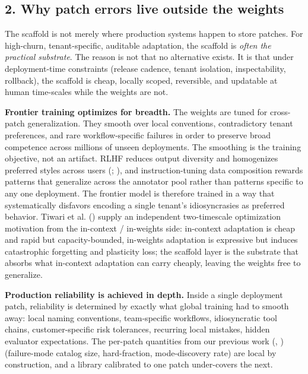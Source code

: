 \documentclass[
]{article}
\begin{document}
\subsection{2. Why patch errors live outside the
weights}\label{why-patch-errors-live-outside-the-weights}

The scaffold is not merely where production systems happen to store
patches. For high-churn, tenant-specific, auditable adaptation, the
scaffold is \emph{often the practical substrate}. The reason is not that
no alternative exists. It is that under deployment-time constraints
(release cadence, tenant isolation, inspectability, rollback), the
scaffold is cheap, locally scoped, reversible, and updatable at human
time-scales while the weights are not.

\textbf{Frontier training optimizes for breadth.} The weights are tuned
for cross-patch generalization. They smooth over local conventions,
contradictory tenant preferences, and rare workflow-specific failures in
order to preserve broad competence across millions of unseen
deployments. The smoothing is the training objective, not an artifact.
RLHF reduces output diversity and homogenizes preferred styles across
users (;
), and
instruction-tuning data composition rewards patterns that generalize
across the annotator pool rather than patterns specific to any one
deployment. The frontier model is therefore trained in a way that
systematically disfavors encoding a single tenant's idiosyncrasies as
preferred behavior. Tiwari et al.
() supply an independent
two-timescale optimization motivation from the in-context / in-weights
side: in-context adaptation is cheap and rapid but capacity-bounded,
in-weights adaptation is expressive but induces catastrophic forgetting
and plasticity loss; the scaffold layer is the substrate that absorbs
what in-context adaptation can carry cheaply, leaving the weights free
to generalize.

\textbf{Production reliability is achieved in depth.} Inside a single
deployment patch, reliability is determined by exactly what global
training had to smooth away: local naming conventions, team-specific
workflows, idiosyncratic tool chains, customer-specific risk tolerances,
recurring local mistakes, hidden evaluator expectations. The per-patch
quantities from our previous work
(,
) (failure-mode catalog
size, hard-fraction, mode-discovery rate) are local by construction, and
a library calibrated to one patch under-covers the next.
\end{document}
